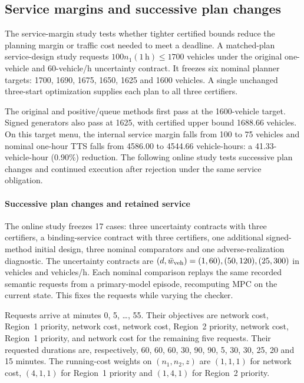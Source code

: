 \documentclass[journal,10pt]{IEEEtran}
\begin{document}
\subsection{Service margins and successive plan changes}

The service-margin study tests whether tighter certified bounds reduce
the planning margin or traffic cost needed to meet a deadline. A matched-plan
service-design study requests $100n_1(1\,\mathrm h)\le1700$ vehicles under
the original one-vehicle and 60-vehicle/h uncertainty contract. It freezes
six nominal planner targets: 1700, 1690, 1675, 1650, 1625 and 1600 vehicles.
A single unchanged three-start optimization supplies each plan to all
three certifiers.

The original and positive/queue methods first pass at the 1600-vehicle
target. Signed generators also pass at 1625, with certified upper bound
1688.66 vehicles. On this target menu, the internal service margin
falls from 100 to 75 vehicles and nominal one-hour TTS falls from 4586.00
to 4544.66 vehicle-hours: a 41.33-vehicle-hour (0.90\%) reduction. The following online study tests successive plan changes and
continued
execution after rejection under the same service obligation.

\paragraph{Successive plan changes and retained service}
The online study freezes 17 cases: three uncertainty contracts with three
certifiers, a binding-service contract with three certifiers, one additional
signed-method initial design, three nominal comparators and one
adverse-realization diagnostic. The uncertainty contracts are $(d,\bar w_{\rm veh})
=(1,60),(50,120),(25,300)$ in vehicles and vehicles/h. Each nominal
comparison replays the same recorded semantic requests from a primary-model
episode, recomputing MPC on the current state. This fixes the requests
while varying the checker.

Requests arrive at minutes 0, 5, \ldots, 55. Their objectives are network
cost, Region~1 priority, network cost, network cost, Region~2 priority,
network cost, Region~1 priority, and network cost for the remaining five
requests. Their requested durations are, respectively, 60, 60, 60, 30, 90,
90, 5, 30, 30, 25, 20 and 15 minutes. The running-cost weights on
$(n_1,n_2,z)$ are $(1,1,1)$ for network cost, $(4,1,1)$ for Region~1
priority and $(1,4,1)$ for Region~2 priority.
\end{document}
